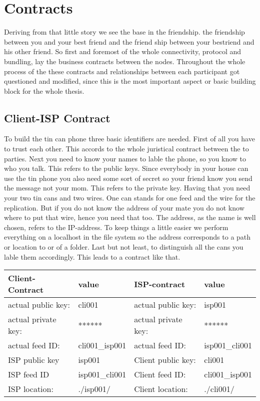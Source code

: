 \section{Contracts}
Deriving from that little story we see the base in the friendship. the friendship between you and your best friend and the friend ship between your bestriend and his other friend. So first and foremost of the whole connectivity, protocol and bundling, lay the business contracts between the nodes. Throughout the whole process of the these contracts and relationships between each participant got questioned and modified, since this is the most important aspect or basic building block for the whole thesis.\\

\subsection{Client-ISP Contract}

To build the tin can phone three basic identifiers are needed. First of all you have to trust each other. This accords to the whole juristical contract between the to parties. Next you need to know your names to lable the phone, so you know to who you talk. This refers to the public keys. Since everybody in your house can use the tin phone you also need some sort of secret so your friend know you send the message not your mom. This refers to the private key. Having that you need your two tin cans and two wires. One can stands for one feed and the wire for the replication. But if you do not know the address of your mate you do not know where to put that wire, hence you need that too. The address, as the name is well chosen, refers to the IP-address. To keep things a little easier we perform everything on a localhost in the file system so the address corresponds to a path or location to or of a folder. Last but not least, to distinguish all the cans you lable them accordingly. This leads to a contract like that.\\



\begin{tabular}{llll} \toprule
    Client-Contract&value&ISP-contract&value\\ \midrule
    actual public key:& cli001 &  actual public key: &isp001  \\ 
    actual private key:& ****** & actual private key:& ****** \\
    actual feed ID:& cli001\_isp001 &actual feed ID:&isp001\_cli001 \\ 
    ISP public key&isp001&Client public key:&cli001\\
    ISP feed ID&isp001\_cli001&Client feed ID:&cli001\_isp001\\
    ISP location:&.\slash isp001\slash &Client location:& .\slash cli001\slash \\\bottomrule
\end{tabular}
